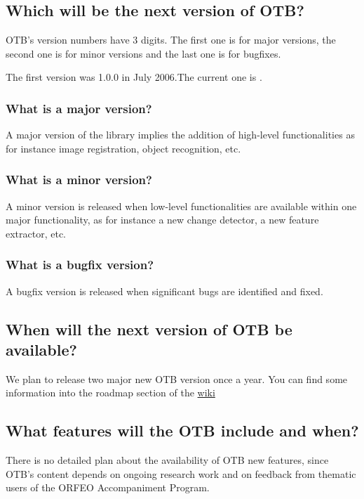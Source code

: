 \subsection{Which will be the next version of OTB?}
OTB's version numbers have 3 digits. The first one is for major
versions, the second one is for minor versions and the last one is for
bugfixes.

The first version was 1.0.0 in July 2006.The current one is \otbversion.

\subsubsection{What is a major version?}
A major version of the library implies the addition of high-level
functionalities as for instance image registration, object recognition, etc.

\subsubsection{What is a minor version?}
A minor version is released when low-level functionalities are
available within one major functionality, as for instance a new
change detector, a new feature extractor, etc.

\subsubsection{What is a bugfix version?}
A bugfix version is released when significant bugs are identified and fixed.

\subsection{When will the next version of OTB be available?}
We plan to release two major new OTB version once a year. You can find some information into the roadmap section of the \href{http://wiki.orfeo-toolbox.org/index.php/Main_Page}{wiki}

\subsection{What features will the OTB include and when?}
There is no detailed plan about the availability of OTB new features,
since OTB's content depends on ongoing research work and on feedback
from thematic users of the ORFEO Accompaniment Program.

